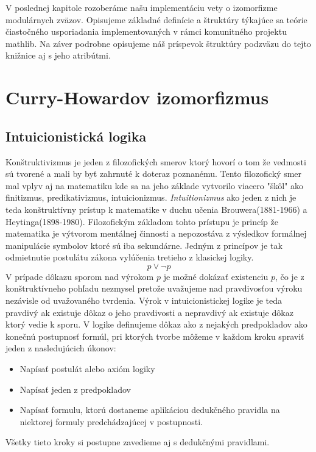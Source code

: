 \documentclass[a4paper,10pt,oneside]{report}%
\begin{document}
    V poslednej kapitole rozoberáme našu implementáciu vety o izomorfizme modulárnych
zväzov.
    Opisujeme základné definície a štruktúry týkajúce sa teórie čiastočného usporiadania
implementovaných v rámci komunitného projektu mathlib.
    Na záver podrobne opisujeme náš príspevok štruktúry podzväzu do tejto knižnice aj s jeho atribútmi.

\chapter{Curry-Howardov izomorfizmus}
\section{Intuicionistická logika}
    Konštruktivizmus je jeden z filozofických smerov ktorý hovorí o tom že vedmosti
sú tvorené a mali by byť zahrnuté k doteraz poznanému.
    Tento filozofický smer mal vplyv aj na matematiku kde sa na jeho základe
vytvorilo viacero "škôl" ako finitizmus, predikativizmus, intuicionizmus.
    \emph{Intuitionizmus} ako jeden z nich je teda konštruktívny prístup k matematike
v duchu učenia Brouwera(1881-1966) a Heytinga(1898-1980).
    Filozofickým základom tohto prístupu je princíp že matematika je výtvorom mentálnej
činnosti a nepozostáva z výsledkov formálnej manipulácie symbolov ktoré sú iba
sekundárne.
    Jedným z princípov je tak odmietnutie postulátu zákona vylúčenia tretieho
z klasickej logiky.
\begin{equation}
    p \vee \neg p
\end{equation}
    V prípade dôkazu sporom nad výrokom $p$ je možné dokázať existenciu $p$,
čo je z konštruktívneho pohľadu nezmysel pretože uvažujeme nad pravdivosťou
    výroku nezávisle od uvažovaného tvrdenia.
Výrok v intuicionistickej logike je teda pravdivý ak existuje dôkaz o jeho pravdivosti
a nepravdivý ak existuje dôkaz ktorý vedie k sporu.
    V logike definujeme dôkaz ako z nejakých predpokladov ako konečnú postupnosť
formúl, pri ktorých tvorbe môžeme v každom kroku spraviť jeden z nasledujúcich
úkonov:
\begin{itemize}
    \item Napísať postulát alebo axióm logiky
    \item Napísať jeden z predpokladov
    \item Napísať formulu, ktorú dostaneme aplikáciou dedukčného pravidla na niektorej
formuly predchádzajúcej v postupnosti.
\end{itemize}
    Všetky tieto kroky si postupne zavedieme aj s dedukčnými pravidlami.
\end{document}
